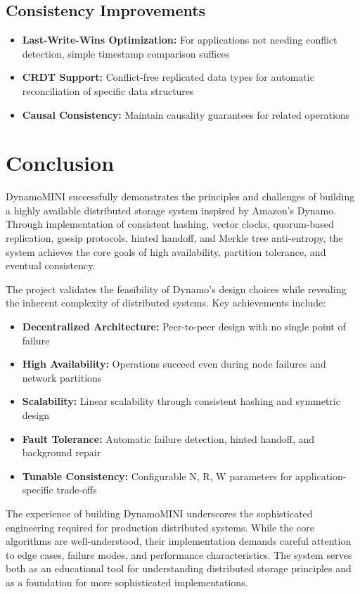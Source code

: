 \documentclass[conference]{IEEEtran}
\begin{document}
\subsection{Consistency Improvements}
\begin{itemize}
    \item \textbf{Last-Write-Wins Optimization:} For applications not needing conflict detection, simple timestamp comparison suffices
    \item \textbf{CRDT Support:} Conflict-free replicated data types for automatic reconciliation of specific data structures
    \item \textbf{Causal Consistency:} Maintain causality guarantees for related operations
\end{itemize}

\section{Conclusion}
DynamoMINI successfully demonstrates the principles and challenges of building a highly available distributed storage system inspired by Amazon's Dynamo. Through implementation of consistent hashing, vector clocks, quorum-based replication, gossip protocols, hinted handoff, and Merkle tree anti-entropy, the system achieves the core goals of high availability, partition tolerance, and eventual consistency.

The project validates the feasibility of Dynamo's design choices while revealing the inherent complexity of distributed systems. Key achievements include:

\begin{itemize}
    \item \textbf{Decentralized Architecture:} Peer-to-peer design with no single point of failure
    \item \textbf{High Availability:} Operations succeed even during node failures and network partitions
    \item \textbf{Scalability:} Linear scalability through consistent hashing and symmetric design
    \item \textbf{Fault Tolerance:} Automatic failure detection, hinted handoff, and background repair
    \item \textbf{Tunable Consistency:} Configurable N, R, W parameters for application-specific trade-offs
\end{itemize}

The experience of building DynamoMINI underscores the sophisticated engineering required for production distributed systems. While the core algorithms are well-understood, their implementation demands careful attention to edge cases, failure modes, and performance characteristics. The system serves both as an educational tool for understanding distributed storage principles and as a foundation for more sophisticated implementations.
\end{document}

